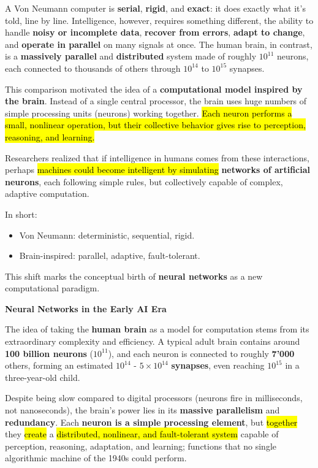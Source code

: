 \highspace
A Von Neumann computer is \textbf{serial}, \textbf{rigid}, and \textbf{exact}: it does exactly what it's told, line by line. Intelligence, however, requires something different, the ability to handle \textbf{noisy or incomplete data}, \textbf{recover from errors}, \textbf{adapt to change}, and \textbf{operate in parallel} on many signals at once. The human brain, in contrast, is a \textbf{massively parallel} and \textbf{distributed} system made of roughly $10^{11}$ neurons, each connected to thousands of others through $10^{14}$ to $10^{15}$ synapses.

\highspace
This comparison motivated the idea of a \textbf{computational model inspired by the brain}. Instead of a single central processor, the brain uses huge numbers of simple processing units (neurons) working together. \hl{Each neuron performs a small, nonlinear operation, but their collective behavior gives rise to perception, reasoning, and learning.}

\highspace
Researchers realized that if intelligence in humans comes from these interactions, perhaps \hl{machines could become intelligent by simulating} \textbf{networks of artificial neurons}, each following simple rules, but collectively capable of complex, adaptive computation.

\newpage

\noindent
In short:
\begin{itemize}
    \item Von Neumann: deterministic, sequential, rigid.
    \item Brain-inspired: parallel, adaptive, fault-tolerant.
\end{itemize}
This shift marks the conceptual birth of \textbf{neural networks} as a new computational paradigm.

\highspace
\begin{flushleft}
    \textcolor{Green3}{ \textbf{Neural Networks in the Early AI Era}}
\end{flushleft}
The idea of taking the \textbf{human brain} as a model for computation stems from its extraordinary complexity and efficiency. A typical adult brain contains around \textbf{100 billion neurons} ($10^{11}$), and each neuron is connected to roughly \textbf{7'000} others, forming an estimated $10^{14}$ - $5 \times 10^{14}$ \textbf{synapses}, even reaching $10^{15}$ in a three-year-old child.

\highspace
Despite being slow compared to digital processors (neurons fire in milliseconds, not nanoseconds), the brain's power lies in its \textbf{massive parallelism} and \textbf{redundancy}. Each \textbf{neuron is a simple processing element}, but \hl{together} they \hl{create} a \hl{distributed, nonlinear, and fault-tolerant system} capable of perception, reasoning, adaptation, and learning; functions that no single algorithmic machine of the 1940s could perform.

